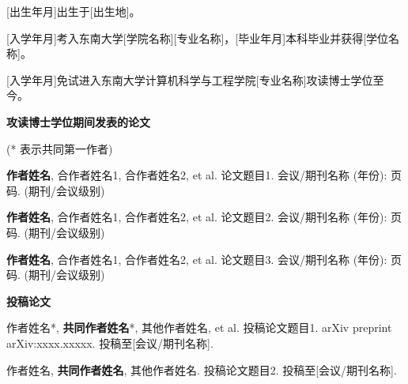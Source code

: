 

[出生年月]出生于[出生地]。

[入学年月]考入东南大学[学院名称][专业名称]，[毕业年月]本科毕业并获得[学位名称]。

[入学年月]免试进入东南大学计算机科学与工程学院[专业名称]攻读博士学位至今。

\begin{flushleft}
{\bfseries \large 攻读博士学位期间发表的论文}
\end{flushleft}

\noindent
(* 表示共同第一作者)

\noindent
[1] \textbf{作者姓名}, 合作者姓名1, 合作者姓名2, et al. 论文题目1. 会议/期刊名称 (年份): 页码. (期刊/会议级别)

\noindent
[2] \textbf{作者姓名}, 合作者姓名1, 合作者姓名2, et al. 论文题目2. 会议/期刊名称 (年份): 页码. (期刊/会议级别)

\noindent
[3] \textbf{作者姓名}, 合作者姓名1, 合作者姓名2, et al. 论文题目3. 会议/期刊名称 (年份): 页码. (期刊/会议级别)

\noindent
[添加更多论文...]


\begin{flushleft}
  {\bfseries \large 投稿论文}
\end{flushleft}

\noindent

\noindent
[1] 作者姓名*, \textbf{共同作者姓名}*, 其他作者姓名, et al. 投稿论文题目1. arXiv preprint arXiv:xxxx.xxxxx. 投稿至[会议/期刊名称].

\noindent
[2] 作者姓名, \textbf{共同作者姓名}, 其他作者姓名. 投稿论文题目2. 投稿至[会议/期刊名称].
